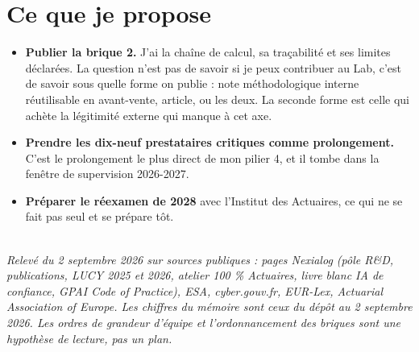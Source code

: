 \documentclass[11pt,a4paper]{article}
\begin{document}
\section{Ce que je propose}

\begin{itemize}
\item \textbf{Publier la brique 2.} J'ai la chaîne de calcul, sa traçabilité et ses limites
      déclarées. La question n'est pas de savoir si je peux contribuer au Lab, c'est de savoir
      sous quelle forme on publie : note méthodologique interne réutilisable en avant-vente,
      article, ou les deux. La seconde forme est celle qui achète la légitimité externe qui
      manque à cet axe.
\item \textbf{Prendre les dix-neuf prestataires critiques comme prolongement.} C'est le
      prolongement le plus direct de mon pilier 4, et il tombe dans la fenêtre de supervision
      2026-2027.
\item \textbf{Préparer le réexamen de 2028} avec l'Institut des Actuaires, ce qui ne se fait pas
      seul et se prépare tôt.
\end{itemize}

\vspace{8pt}
\noindent{\color{accent}\rule{\textwidth}{0.6pt}}\\[2pt]
{\footnotesize\itshape Relevé du 2 septembre 2026 sur sources publiques : pages Nexialog (pôle
R\&D, publications, LUCY 2025 et 2026, atelier 100 \% Actuaires, livre blanc IA de confiance,
GPAI Code of Practice), ESA, cyber.gouv.fr, EUR-Lex, Actuarial Association of Europe. Les
chiffres du mémoire sont ceux du dépôt au 2 septembre 2026. Les ordres de grandeur d'équipe et
l'ordonnancement des briques sont une hypothèse de lecture, pas un plan.}
\end{document}
